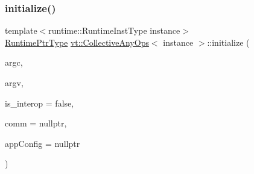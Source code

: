 \mbox{\label{structvt_1_1_collective_any_ops_aadcc1fe5e20336eebcd28d5800700cc4}} 
\subsubsection{\texorpdfstring{initialize()}{initialize()}\hspace{0.1cm}{\footnotesize\ttfamily [1/2]}}
{\footnotesize\ttfamily template$<$runtime\+::\+Runtime\+Inst\+Type instance$>$ \\
\hyperlink{namespacevt_a0ce60e0299d8fa32223b3b9ffa0af466}{Runtime\+Ptr\+Type} \hyperlink{structvt_1_1_collective_any_ops}{vt\+::\+Collective\+Any\+Ops}$<$ instance $>$\+::initialize (\begin{DoxyParamCaption}\item[{int \&}]{argc,  }\item[{char $\ast$$\ast$\&}]{argv,  }\item[{bool}]{is\+\_\+interop = {\ttfamily false},  }\item[{M\+P\+I\+\_\+\+Comm $\ast$}]{comm = {\ttfamily nullptr},  }\item[{\hyperlink{structvt_1_1arguments_1_1_app_config}{arguments\+::\+App\+Config} const $\ast$}]{app\+Config = {\ttfamily nullptr} }\end{DoxyParamCaption})\hspace{0.3cm}{\ttfamily [static]}}

\mbox{\label{structvt_1_1_collective_any_ops_a8b33216bf58d945721ab8d74d255dac5}} 

